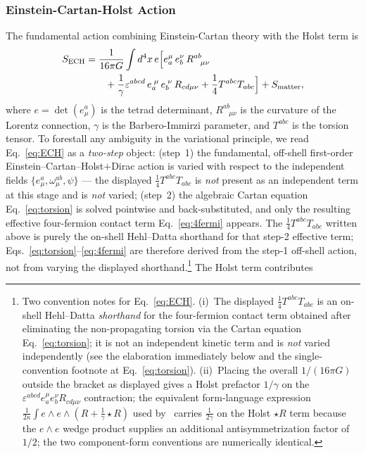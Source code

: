 \documentclass[aps,prd,twocolumn,superscriptaddress,showpacs,preprintnumbers,nofootinbib,longbibliography,floatfix]{revtex4-2}
\begin{document}
\subsubsection{Einstein-Cartan-Holst Action}

The fundamental action combining Einstein-Cartan theory with the Holst term is
\begin{align}\label{eq:ECH}
S_{\rm ECH} &= \frac{1}{16\pi G} \int d^4x\, e \Bigl[e^\mu_a\,e^\nu_b\,R^{ab}_{\;\;\;\mu\nu}\nonumber\\
&\qquad + \frac{1}{\gamma} \varepsilon^{abcd}\,e_{a}^{\;\mu}\,e_{b}^{\;\nu}\,R_{cd\mu\nu}
+ \frac{1}{4} T^{abc} T_{abc}\Bigr] + S_{\rm matter},
\end{align}
where $e = \det(e^a_\mu)$ is the tetrad determinant, $R^{ab}_{\;\;\;\mu\nu}$ is
the curvature of the Lorentz connection, $\gamma$ is the Barbero-Immirzi
parameter, and $T^{abc}$ is the torsion tensor. To forestall any ambiguity in
the variational principle, we read Eq.~\eqref{eq:ECH} as a \emph{two-step}
object: (step~1) the fundamental, off-shell first-order
Einstein--Cartan--Holst$+$Dirac action is varied with respect to the
independent fields $\{e^a_\mu,\omega^{ab}_\mu,\psi\}$ --- the displayed
$\tfrac14 T^{abc}T_{abc}$ is \emph{not} present as an independent term at this
stage and is \emph{not} varied; (step~2) the algebraic Cartan equation
Eq.~\eqref{eq:torsion} is solved pointwise and back-substituted, and only the
resulting effective four-fermion contact term Eq.~\eqref{eq:4fermi} appears.
The $\tfrac14 T^{abc}T_{abc}$ written above is purely the on-shell Hehl--Datta
shorthand for that step-2 effective term; Eqs.~\eqref{eq:torsion}--\eqref{eq:4fermi}
are therefore derived from the step-1 off-shell action, not from varying the
displayed shorthand.\footnote{Two convention
notes for Eq.~\eqref{eq:ECH}. (i)~The displayed $\tfrac{1}{4}T^{abc}T_{abc}$
is an on-shell Hehl--Datta \emph{shorthand} for the four-fermion contact
term obtained after eliminating the non-propagating torsion via the Cartan
equation Eq.~\eqref{eq:torsion}; it is not an independent kinetic term and
is \emph{not} varied independently (see the elaboration immediately below
and the single-convention footnote at Eq.~\eqref{eq:torsion}). (ii)~Placing
the overall $1/(16\pi G)$ outside the bracket as displayed gives a Holst
prefactor $1/\gamma$ on the $\varepsilon^{abcd}e_a^\mu e_b^\nu R_{cd\mu\nu}$
contraction; the equivalent form-language expression
$\frac{1}{2\kappa}\int e\wedge e\wedge(R+\frac{1}{\gamma}\star R)$ used
by~\cite{Mercuri2009,Freidel2005} carries $\frac{1}{2\gamma}$ on the Holst
$\star R$ term because the $e\wedge e$ wedge product supplies an additional
antisymmetrization factor of $1/2$; the two component-form conventions are
numerically identical.} The Holst term contributes
\end{document}
